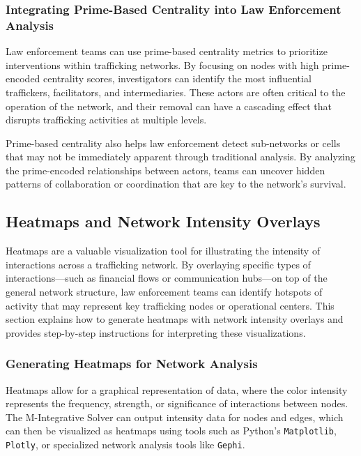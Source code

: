 \documentclass[%
 preprint, linenumbers,
 amsmath,amssymb,
 aps, physrev,
]{revtex4-2}
\begin{document}
\subsubsection{Integrating Prime-Based Centrality into Law Enforcement Analysis}

Law enforcement teams can use prime-based centrality metrics to prioritize interventions within trafficking networks. By focusing on nodes with high prime-encoded centrality scores, investigators can identify the most influential traffickers, facilitators, and intermediaries. These actors are often critical to the operation of the network, and their removal can have a cascading effect that disrupts trafficking activities at multiple levels.

Prime-based centrality also helps law enforcement detect sub-networks or cells that may not be immediately apparent through traditional analysis. By analyzing the prime-encoded relationships between actors, teams can uncover hidden patterns of collaboration or coordination that are key to the network’s survival.

\subsection{Heatmaps and Network Intensity Overlays}

Heatmaps are a valuable visualization tool for illustrating the intensity of interactions across a trafficking network. By overlaying specific types of interactions—such as financial flows or communication hubs—on top of the general network structure, law enforcement teams can identify hotspots of activity that may represent key trafficking nodes or operational centers. This section explains how to generate heatmaps with network intensity overlays and provides step-by-step instructions for interpreting these visualizations.

\subsubsection{Generating Heatmaps for Network Analysis}

Heatmaps allow for a graphical representation of data, where the color intensity represents the frequency, strength, or significance of interactions between nodes. The M-Integrative Solver can output intensity data for nodes and edges, which can then be visualized as heatmaps using tools such as Python's \texttt{Matplotlib}, \texttt{Plotly}, or specialized network analysis tools like \texttt{Gephi}.
\end{document}
